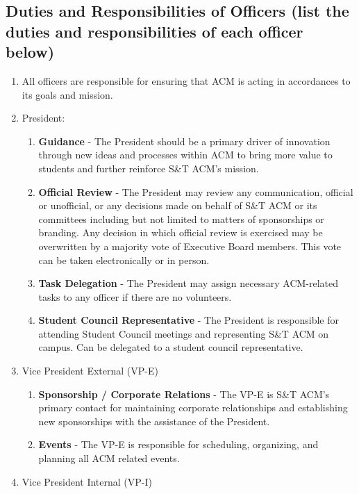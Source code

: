 \subsection{Duties and Responsibilities of Officers (list the duties and
responsibilities of each officer below)}
\begin{enumerate}
  \item All officers are responsible for ensuring that ACM is acting in
    accordances to its goals and mission.
  \item President:
    \begin{enumerate}
      \item \textbf{Guidance} - The President should be a primary driver of
        innovation through new ideas and processes within ACM to bring more
        value to students and further reinforce S\&T ACM's mission.
      \item \textbf{Official Review} - The President may review any
        communication, official or unofficial, or any decisions made on behalf
        of S\&T ACM or its committees including but not limited to matters of
        sponsorships or branding. Any decision in which official review is
        exercised may be overwritten by a majority vote of Executive Board
        members. This vote can be taken electronically or in person.
      \item \textbf{Task Delegation} - The President may assign necessary
        ACM-related tasks to any officer if there are no volunteers.
      \item \textbf{Student Council Representative} - The President is
        responsible for attending Student Council meetings and representing S\&T
        ACM on campus. Can be delegated to a student council representative.
    \end{enumerate}
  \item Vice President External (VP-E)
    \begin{enumerate}
      \item \textbf{Sponsorship / Corporate Relations} - The VP-E is S\&T ACM's
        primary contact for maintaining corporate relationships and
        establishing new sponsorships with the assistance of the President.
      \item \textbf{Events} - The VP-E is responsible for scheduling,
        organizing, and planning all ACM related events.
    \end{enumerate}
  \item Vice President Internal (VP-I)
    \begin{enumerate}

\end{enumerate}
\end{enumerate}
